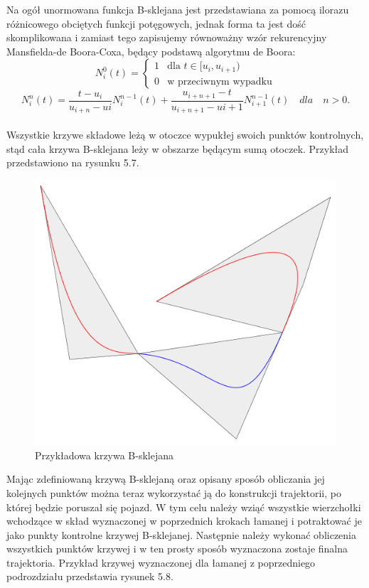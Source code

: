 \documentclass[a4paper,11pt,twoside]{report}
\theoremstyle{definition}
\begin{document}
Na ogół unormowana funkcja B-sklejana jest przedstawiana za pomocą ilorazu różnicowego obciętych funkcji potęgowych, jednak forma ta jest dość skomplikowana i zamiast tego zapisujemy równoważny wzór rekurencyjny Mansfielda-de Boora-Coxa, będący podstawą algorytmu de Boora:
\\
$$
N^{0}_{i}(t) = 
\left\{ \begin{array}{ll}
1 & \textrm{dla $t \in [u_{i}, u_{i+1})$}\\
0 & \textrm{w przeciwnym wypadku}
\end{array} \right.
$$
$$
N^{n}_{i}(t) = \frac{t - u_{i}}{u_{i + n} - u{i}}N^{n - 1}_{i}(t) + \frac{u_{i + n + 1} - t}{u_{i + n + 1} - u{i + 1}}N^{n - 1}_{i + 1}(t) \quad dla \quad n > 0.
$$
\\
Wszystkie krzywe składowe leżą w otoczce wypukłej swoich punktów kontrolnych, stąd cała krzywa B-sklejana leży w obszarze będącym sumą otoczek. Przykład przedstawiono na rysunku 5.7.

\begin{figure}[h!]
\centering
\includegraphics[scale=0.3]{bsplineConvexHull}
\caption[Przykładowa krzywa B-Sklejana]{Przykładowa krzywa B-sklejana}
\end{figure}

Mając zdefiniowaną krzywą B-sklejaną oraz opisany sposób obliczania jej kolejnych punktów można teraz wykorzystać ją do konstrukcji trajektorii, po której będzie poruszał się pojazd. W tym celu należy wziąć wszystkie wierzchołki wchodzące w skład wyznaczonej w poprzednich krokach łamanej i potraktować je jako punkty kontrolne krzywej B-sklejanej. Następnie należy wykonać obliczenia wszystkich punktów krzywej i w ten prosty sposób wyznaczona zostaje finalna trajektoria. Przykład krzywej wyznaczonej dla łamanej z poprzedniego podrozdziału przedstawia rysunek 5.8.
\end{document}
